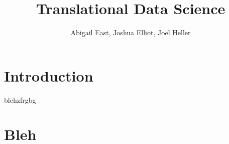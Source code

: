 \documentclass{article}
\title{ 
\fontsize{22pt}{10pt}\selectfont\textbf{Translational Data Science}}
\author{Abigail East, Joshua Elliot, Joël Heller}
\begin{document}
	
\thispagestyle{fancy} %
	
\maketitle	
\newpage
	
	
	


\tableofcontents

\newpage

	
\section{Introduction}

blehzfrgbg \cite{Milligan1981}
\cite{Ester:1996:DAD:3001460.3001507}

\section{Bleh}
	

	
\end{document}
